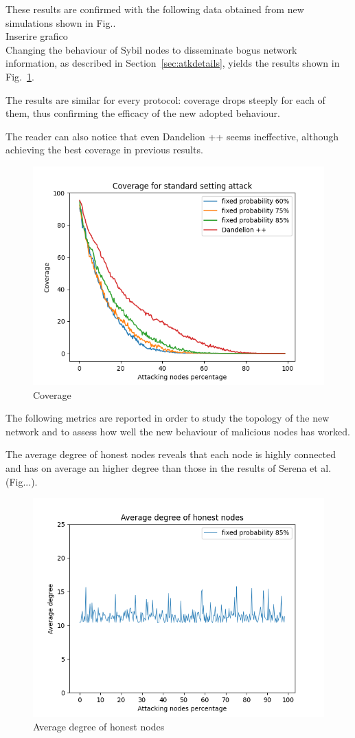 \documentclass[12pt, letterpaper, twoside]{article}
\begin{document}
These results are confirmed with the following data obtained from new simulations shown in Fig..\\

Inserire grafico\\

Changing the behaviour of Sybil nodes to disseminate bogus network information, as described in Section~\ref{sec:atkdetails}, yields the results shown in Fig.~\ref{fig:in-cov}.

The results are similar for every protocol: coverage drops steeply for each of them, thus confirming the efficacy of the new adopted behaviour.

The reader can also notice that even Dandelion ++ seems ineffective, although achieving the best coverage in previous results.\\

\begin{figure}[h!]
	\includegraphics[width=.7\textwidth]{pict/results/in-cov.png}
	\centering 
	\caption{Coverage}
	\label{fig:in-cov}
\end{figure}

The following metrics are reported in order to study the topology of the new network and to assess how well the new behaviour of malicious nodes has worked.

The average degree of honest nodes reveals that each node is highly connected and has on average an higher degree than those in the results of Serena et al. (Fig...). \\

\begin{figure}[h!]
	\includegraphics[width=.7\textwidth]{pict/results/in-hon-avg-neigh.png}
	\centering
	\caption{Average degree of honest nodes}
	\label{fig:degreehon}
\end{figure}
\end{document}
